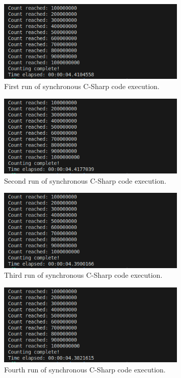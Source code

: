 \documentclass[12pt,a4paper]{article}
\begin{document}
\begin{figure}[htbp]
    \centering
    \includegraphics[width=0.8\textwidth]{../sync_records/results_cs/result_1.png}
    \caption{First run of synchronous C-Sharp code execution.}
    \label{fig:C-Sharp-runtime-1}
\end{figure}

\begin{figure}[htbp]
    \centering
    \includegraphics[width=0.8\textwidth]{../sync_records/results_cs/result_2.png}
    \caption{Second run of synchronous C-Sharp code execution.}
    \label{fig:C-Sharp-runtime-2}
\end{figure}

\begin{figure}[htbp]
    \centering
    \includegraphics[width=0.8\textwidth]{../sync_records/results_cs/result_3.png}
    \caption{Third run of synchronous C-Sharp code execution.}
    \label{fig:C-Sharp-runtime-3}
\end{figure}

\begin{figure}[htbp]
    \centering
    \includegraphics[width=0.8\textwidth]{../sync_records/results_cs/result_4.png}
    \caption{Fourth run of synchronous C-Sharp code execution.}
    \label{fig:C-Sharp-runtime-4}
\end{figure}
\end{document}
